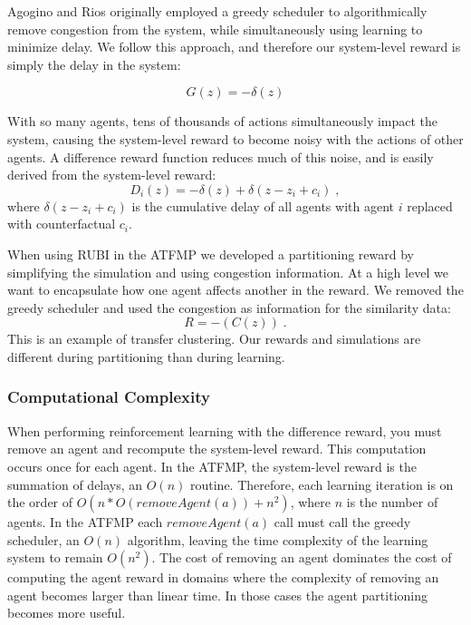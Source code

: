 \documentclass[smallcondensed]{svjour3}
\begin{document}

Agogino and Rios \cite{Agogino:2009:EEM:1570256.1570258} originally employed a greedy scheduler to algorithmically remove congestion from the system, while simultaneously using learning to minimize delay. We follow this approach, and therefore our system-level reward is simply the delay in the system:

\begin{equation}
G(z) = -\delta(z)
\end{equation}

With so many agents, tens of thousands of actions simultaneously impact the system, causing the system-level reward to become noisy with the actions of other agents. A difference reward function reduces much of this noise, and is easily derived from the system-level reward:
%
\begin{equation}
D_i(z) = - \delta(z) + \delta(z-z_i + c_i)\;,
\end{equation}
%
where \textit{$\delta(z-z_i + c_i)$} is the cumulative delay of all agents with agent $i$ replaced with counterfactual \textit{$c_i$}.

When using RUBI in the ATFMP we developed a partitioning reward by simplifying the simulation and using congestion information. At a high level we want to encapsulate how one agent affects another in the reward. We removed the greedy scheduler and used the congestion as information for the similarity data:
%
\begin{equation} \label{eq:RUBI ATFMP-L}
R = -(C(z))\;.
\end{equation}
%
This is an example of transfer clustering. Our rewards and simulations are different during partitioning than during learning.

\subsubsection{Computational Complexity}
\label{sec:Complexity}
When performing reinforcement learning with the difference reward, you must remove an agent and recompute the system-level reward. This computation occurs once for each agent. In the ATFMP, the system-level reward is the summation of delays, an $O(n)$ routine. Therefore, each learning iteration is on the order of $O(n * O(removeAgent(a)) + n^2)$, where $n$ is the number of agents. In the ATFMP each $removeAgent(a)$ call must call the greedy scheduler, an $O(n)$ algorithm, leaving the time complexity of the learning system to remain $O(n^2)$. The cost of removing an agent dominates the cost of computing the agent reward in domains where the complexity of removing an agent becomes larger than linear time. In those cases the agent partitioning becomes more useful.
\end{document}
